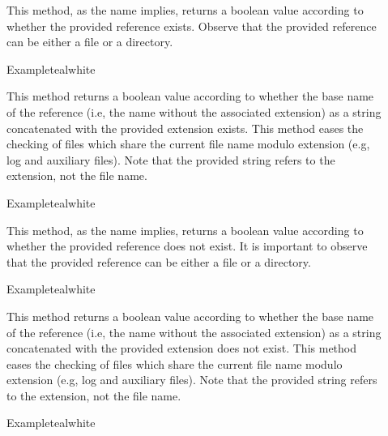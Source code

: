 \begin{description}
\item[] This method, as the name implies, returns a boolean value according to whether the provided  reference exists. Observe that the provided reference can be either a file or a directory.

\begin{codebox}{Example}{teal}{\icnote}{white}
\end{codebox}

\item[] This method returns a boolean value according to whether the base name of the  reference (i.e, the name without the associated extension) as a string concatenated with the provided  extension exists. This method eases the checking of files which share the current file name modulo extension (e.g, log and auxiliary files). Note that the provided string refers to the extension, not the file name.

\begin{codebox}{Example}{teal}{\icnote}{white}
\end{codebox}

\item[] This method, as the name implies, returns a boolean value according to whether the provided  reference does not exist. It is important to observe that the provided reference can be either a file or a directory.

\begin{codebox}{Example}{teal}{\icnote}{white}
\end{codebox}

\item[] This method returns a boolean value according to whether the base name of the  reference (i.e, the name without the associated extension) as a string concatenated with the provided  extension does not exist. This method eases the checking of files which share the current file name modulo extension (e.g, log and auxiliary files). Note that the provided string refers to the extension, not the file name.

\begin{codebox}{Example}{teal}{\icnote}{white}
\end{codebox}


\end{description}
